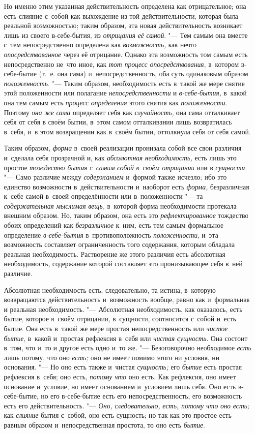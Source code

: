 Но именно этим указанная действительность определена как отрицательное; она
есть слияние с~собой как выхождение из той действительности, которая была
реальной возможностью; таким образом, эта новая действительность возникает
лишь из своего в-себе-бытия, из {\em отрицания её
самой}. "--- Тем самым она вместе с~тем непосредственно определена как
{\em возможность,} как нечто
{\em опосредствованное} через её отрицание. Однако эта
возможность том самым есть непосредственно не~что иное, как
{\em тот процесс опосредствования,} в~котором
в-себе-бытие (т.~е. она сама) и~непосредственность, оба суть одинаковым
образом {\em положенность}. "--- Таким образом,
необходимость есть в~такой же мере снятие этой положенности или полагание
{\em непосредственности} и
{\em в-себе-бытия,} в~какой она тем самым есть
{\em процесс определения} этого снятия как
{\em положенности}. Поэтому
{\em она же сама} определяет себя как
{\em случайность,} она сама отталкивает себя от себя в
своём бытии, в~этом самом отталкивании лишь возвратилась в~себя, и~в этом
возвращении как в~своём бытии, оттолкнула себя от себя самой.

Таким образом, {\em форма} в~своей реализации пронизала
собой все свои различия и~сделала себя прозрачной и, как
{\em абсолютная необходимость,} есть лишь это простое
{\em тождество бытия с~самим собой в~своём отрицании}
или в {\em сущности}. "--- Само различие между
{\em содержанием} и~формой также исчезло; ибо это
единство возможности в~действительности и~наоборот есть
{\em форма,} безразличная к~себе самой в~своей
определённости или в~положенности "--- та
{\em содержательная мыслимая вещь,} в~которой форма
необходимости протекала внешним образом. Но, таким образом, она есть это
{\em рефлектированное} тождество обоих определений как
{\em безразличное} к~ним, есть тем самым формальное
определение {\em в-себе-бытия} в~противоположность
{\em положенности,} и~эта возможность составляет
ограниченность того содержания, которым обладала реальная необходимость.
Растворение же этого различия есть абсолютная необходимость, содержание
которой составляет это пронизывающее себя в~ней различие.

Абсолютная необходимость есть, следовательно, та истина, в~которую
возвращаются действительность и~возможность вообще, равно как и~формальная
и реальная необходимость. "--- Абсолютная необходимость, как оказалось, есть
бытие, которое в~своём отрицании, в~сущности, соотносится с~собой и~есть
бытие. Она есть в~такой же мере простая непосредственность или
{\em чистое бытие,} в~какой и~простая рефлексия в~себя
или {\em чистая сущность}. Она состоит в~том, что и~то
и другое есть одно и~то же. "--- Безоговорочно необходимое
{\em есть} лишь потому, что оно
{\em есть;} оно не имеет помимо этого ни условия, ни
основания. "--- Но оно есть также и~чистая {\em сущность;}
его {\em бытие} есть простая рефлексия в~себя; оно
есть, {\em потому что} оно есть. Как рефлексия, оно
имеет основание и~условие, но имеет основанием и~условием лишь себя. Оно
есть в-себе-бытие, но его в-себе-бытие есть его непосредственность; его
возможность есть его действительность. "--- {\em Оно, следовательно, есть,
потому что оно есть;} как {\em слияние} бытия с~собой, оно есть сущность; но
так как это простое есть равным образом и~непосредственная простота, то оно
есть {\em бытие}.

